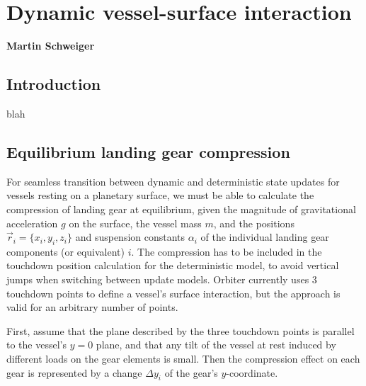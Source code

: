 \documentclass[Orbiter Technical Reference.tex]{subfiles}
\begin{document}
\section{Dynamic vessel-surface interaction}
\textbf{Martin Schweiger}


\subsection{Introduction}
blah

\subsection{Equilibrium landing gear compression}\label{ssec:equi_comp}
For seamless transition between dynamic and deterministic state updates for vessels resting on a planetary surface, we must be able to calculate the compression of landing gear at equilibrium, given the magnitude of gravitational acceleration $g$ on the surface, the vessel mass $m$, and the positions $\vec{r}_i = \lbrace x_i, y_i, z_i\rbrace$ and suspension constants $\alpha_i$ of the individual landing gear components (or equivalent) $i$. The compression has to be included in the touchdown position calculation for the deterministic model, to avoid vertical jumps when switching between update models. Orbiter currently uses 3 touchdown points to define a vessel's surface interaction, but the approach is valid for an arbitrary number of points.

First, assume that the plane described by the three touchdown points is parallel to the vessel's $y=0$ plane, and that any tilt of the vessel at rest induced by different loads on the gear elements is small. Then the compression effect on each gear is represented by a change $\Delta y_i$ of the gear's $y$-coordinate.
\end{document}
